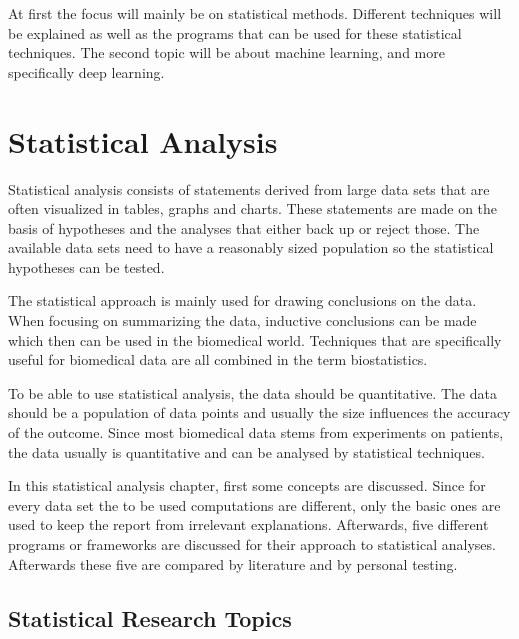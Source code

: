 \documentclass[10pt,a4paper]{article}
\begin{document}
	At first the focus will mainly be on statistical methods. Different 
	techniques will be explained as well as the programs that can be used for 
	these statistical techniques. The second topic will be about machine 
	learning, and more specifically deep learning. 
	
	\clearpage
	
	\section{Statistical Analysis}
	
	Statistical analysis consists of statements derived from large data sets that are often visualized in tables, graphs and charts. These statements are made on the basis of hypotheses and the analyses that either back up or reject those. The available data sets need to have a reasonably sized population so the statistical hypotheses can be tested. \cite{woolson2011statistical} 
	
	The statistical approach is mainly used for drawing conclusions on the 
	data. When focusing on summarizing the data, inductive conclusions can be 
	made which then can be used in the biomedical world. Techniques that are 
	specifically useful for biomedical data are all combined in the term 
	biostatistics. \cite{woolson2011statistical} 
	
	To be able to use statistical analysis, the data should be quantitative. The data should be a population of data points and usually the size influences the accuracy of the outcome. Since most biomedical data stems from experiments on patients, the data usually is quantitative and can be analysed by statistical techniques. \cite{sapsford2006data}
	
	In this statistical analysis chapter, first some concepts are discussed. 
	Since for every data set the to be used computations are different, only 
	the basic ones are used to keep the report from irrelevant explanations. 
	Afterwards, five different programs or frameworks are discussed for their 
	approach to statistical analyses. Afterwards these five are compared by 
	literature and by personal testing.
	
	\clearpage
	
	\subsection{Statistical Research Topics}
	
\end{document}
